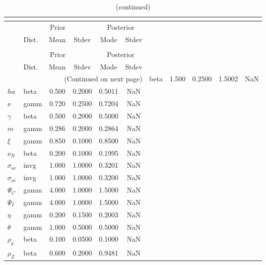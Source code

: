  
\begin{center}
\begin{longtable}{llcccc} 
\caption{Results from posterior maximization (parameters)}\\
 \label{Table:Posterior:1}\\
\toprule 
  & \multicolumn{3}{c}{Prior}  &  \multicolumn{2}{c}{Posterior} \\
  \cmidrule(r{.75em}){2-4} \cmidrule(r{.75em}){5-6}
  & Dist. & Mean  & Stdev & Mode & Stdev \\ 
\midrule \endfirsthead 
\caption{(continued)}\\
 \bottomrule 
  & \multicolumn{3}{c}{Prior}  &  \multicolumn{2}{c}{Posterior} \\
  \cmidrule(r{.75em}){2-4} \cmidrule(r{.75em}){5-6}
  & Dist. & Mean  & Stdev & Mode & Stdev \\ 
\midrule \endhead 
\bottomrule \multicolumn{6}{r}{(Continued on next page)}\endfoot 
\bottomrule\endlastfoot 
${\sigma}$ & beta &   1.500 & 0.2500 &   1.5002 &     NaN \\ 
${ha}$ & beta &   0.500 & 0.2000 &   0.5011 &     NaN \\ 
$\nu$ & gamm &   0.720 & 0.2500 &   0.7204 &     NaN \\ 
$\gamma$ & beta &   0.500 & 0.2000 &   0.5000 &     NaN \\ 
${m}$ & gamm &   0.286 & 0.2000 &   0.2864 &     NaN \\ 
$\xi$ & gamm &   0.850 & 0.1000 &   0.8500 &     NaN \\ 
${\nu_R}$ & beta &   0.200 & 0.1000 &   0.1995 &     NaN \\ 
${\sigma_{ac}}$ & invg &   1.000 & 1.0000 &   0.3201 &     NaN \\ 
${\sigma_{ai}}$ & invg &   1.000 & 1.0000 &   0.3200 &     NaN \\ 
${\Psi_C}$ & gamm &   4.000 & 1.0000 &   1.5000 &     NaN \\ 
${\Psi_I}$ & gamm &   4.000 & 1.0000 &   1.5000 &     NaN \\ 
${\eta}$ & gamm &   0.200 & 0.1500 &   0.2003 &     NaN \\ 
${\theta}$ & gamm &   1.000 & 0.5000 &   0.5000 &     NaN \\ 
${\rho_g}$ & beta &   0.100 & 0.0500 &   0.1000 &     NaN \\ 
${\rho_Z}$ & beta &   0.600 & 0.2000 &   0.9481 &     NaN \\ 

\end{longtable}
\end{center}
